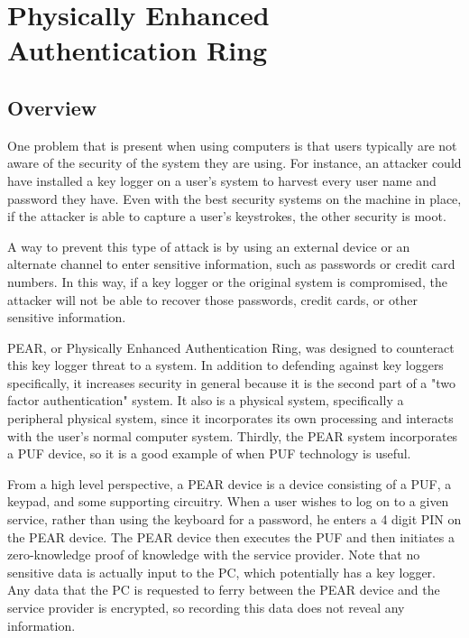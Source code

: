 
\chapter{Physically Enhanced Authentication Ring}
\label{chapter:pear}

\section{Overview}
One problem that is present when using computers is that users typically are not aware of the security of the system
they are using. For instance, an attacker could have installed a key logger on a user's system to harvest every user name
and password they have. Even with the best security systems on the machine in place, if the attacker is able to capture
a user's keystrokes, the other security is moot. 

A way to prevent this type of attack is by using an external device or an alternate channel to enter sensitive information,
such as passwords or credit card numbers. In this way, if a key logger or the original system is compromised, the attacker
will not be able to recover those passwords, credit cards, or other sensitive information.

PEAR, or Physically Enhanced Authentication Ring, was designed to counteract this key logger threat to a system. In addition
to defending against key loggers specifically, it increases security in general because it is the second part of a "two factor
authentication" system. It also is a physical system, specifically a peripheral physical system, since it incorporates its
own processing and interacts with the user's normal computer system. Thirdly, the PEAR system incorporates a PUF device,
so it is a good example of when PUF technology is useful.

From a high level perspective, a PEAR device is a device consisting of a PUF, a keypad, and some supporting circuitry. When
a user wishes to log on to a given service, rather than using the keyboard for a password, he enters a 4 digit PIN on the PEAR
device. The PEAR device then executes the PUF and then initiates a zero-knowledge proof of knowledge with the service
provider. Note that no sensitive data is actually input to the PC, which potentially has a key logger. Any data that the PC
is requested to ferry between the PEAR device and the service provider is encrypted, so recording this data does not reveal
any information.

